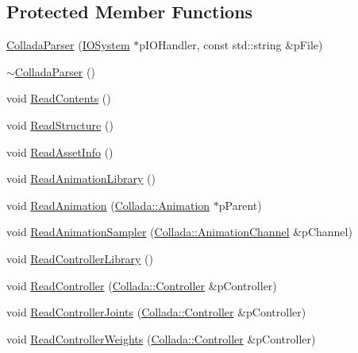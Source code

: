 \subsection*{Protected Member Functions}
\begin{DoxyCompactItemize}
\item 
\hyperlink{class_assimp_1_1_collada_parser_a1567efb45f7129a79e9c93a782338b37}{Collada\+Parser} (\hyperlink{class_assimp_1_1_i_o_system}{I\+O\+System} $\ast$p\+I\+O\+Handler, const std\+::string \&p\+File)
\item 
\hyperlink{class_assimp_1_1_collada_parser_a563745bb6c9316cd0a934ebb8e934316}{$\sim$\+Collada\+Parser} ()
\item 
void \hyperlink{class_assimp_1_1_collada_parser_a1744f170a70bdbfbe6a3877a570f7546}{Read\+Contents} ()
\item 
void \hyperlink{class_assimp_1_1_collada_parser_a33b811a5865cf91cdbb264c49e2c05ae}{Read\+Structure} ()
\item 
void \hyperlink{class_assimp_1_1_collada_parser_a5fe8cbc6d83a5ff757506561bbaec862}{Read\+Asset\+Info} ()
\item 
void \hyperlink{class_assimp_1_1_collada_parser_ab75c82efe19ef5277cf117d01d88ea67}{Read\+Animation\+Library} ()
\item 
void \hyperlink{class_assimp_1_1_collada_parser_a3e3e2256d45f3a5aac3faa0bdcabdae1}{Read\+Animation} (\hyperlink{struct_assimp_1_1_collada_1_1_animation}{Collada\+::\+Animation} $\ast$p\+Parent)
\item 
void \hyperlink{class_assimp_1_1_collada_parser_ac10c36bcc44c65db3f903dd079c152e8}{Read\+Animation\+Sampler} (\hyperlink{struct_assimp_1_1_collada_1_1_animation_channel}{Collada\+::\+Animation\+Channel} \&p\+Channel)
\item 
void \hyperlink{class_assimp_1_1_collada_parser_ab644409f2ae7e067459e995eccd53198}{Read\+Controller\+Library} ()
\item 
void \hyperlink{class_assimp_1_1_collada_parser_a613453df5e1ab0a41eea3a4507006063}{Read\+Controller} (\hyperlink{struct_assimp_1_1_collada_1_1_controller}{Collada\+::\+Controller} \&p\+Controller)
\item 
void \hyperlink{class_assimp_1_1_collada_parser_a280ce3573d46ec83dc8eb863089960e5}{Read\+Controller\+Joints} (\hyperlink{struct_assimp_1_1_collada_1_1_controller}{Collada\+::\+Controller} \&p\+Controller)
\item 
void \hyperlink{class_assimp_1_1_collada_parser_a70836a0337c38cc67ddcf8c697680ab7}{Read\+Controller\+Weights} (\hyperlink{struct_assimp_1_1_collada_1_1_controller}{Collada\+::\+Controller} \&p\+Controller)

\end{DoxyCompactItemize}
